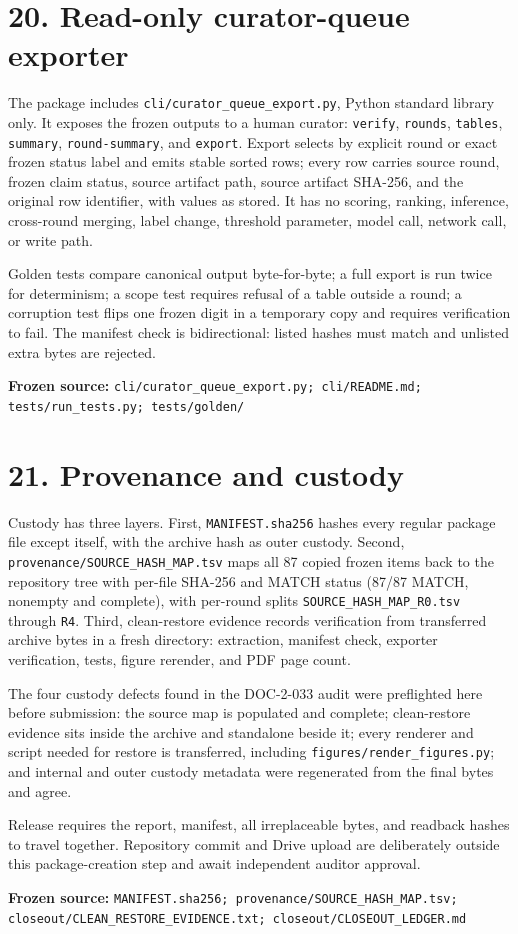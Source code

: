 \documentclass[10pt]{article}
\newcommand{\src}[1]{\par\vfill\noindent\parbox{\linewidth}{\raggedright\sloppy\scriptsize\color{BorderBlue}\textbf{Frozen source:} \texttt{#1}}}
\newcommand{\pg}[2]{\section*{#1}#2}
\begin{document}
\pg{20. Read-only curator-queue exporter}{The package includes \texttt{cli/curator\_queue\_export.py}, Python standard library only. It exposes the frozen outputs to a human curator: \texttt{verify}, \texttt{rounds}, \texttt{tables}, \texttt{summary}, \texttt{round-summary}, and \texttt{export}. Export selects by explicit round or exact frozen status label and emits stable sorted rows; every row carries source round, frozen claim status, source artifact path, source artifact SHA-256, and the original row identifier, with values as stored. It has no scoring, ranking, inference, cross-round merging, label change, threshold parameter, model call, network call, or write path.\par Golden tests compare canonical output byte-for-byte; a full export is run twice for determinism; a scope test requires refusal of a table outside a round; a corruption test flips one frozen digit in a temporary copy and requires verification to fail. The manifest check is bidirectional: listed hashes must match and unlisted extra bytes are rejected.}\src{cli/curator\_queue\_export.py; cli/README.md; tests/run\_tests.py; tests/golden/}\newpage

\pg{21. Provenance and custody}{Custody has three layers. First, \texttt{MANIFEST.sha256} hashes every regular package file except itself, with the archive hash as outer custody. Second, \texttt{provenance/SOURCE\_HASH\_MAP.tsv} maps all 87 copied frozen items back to the repository tree with per-file SHA-256 and MATCH status (87/87 MATCH, nonempty and complete), with per-round splits \texttt{SOURCE\_HASH\_MAP\_R0.tsv} through \texttt{R4}. Third, clean-restore evidence records verification from transferred archive bytes in a fresh directory: extraction, manifest check, exporter verification, tests, figure rerender, and PDF page count.\par The four custody defects found in the DOC-2-033 audit were preflighted here before submission: the source map is populated and complete; clean-restore evidence sits inside the archive and standalone beside it; every renderer and script needed for restore is transferred, including \texttt{figures/render\_figures.py}; and internal and outer custody metadata were regenerated from the final bytes and agree.\par Release requires the report, manifest, all irreplaceable bytes, and readback hashes to travel together. Repository commit and Drive upload are deliberately outside this package-creation step and await independent auditor approval.}\src{MANIFEST.sha256; provenance/SOURCE\_HASH\_MAP.tsv; closeout/CLEAN\_RESTORE\_EVIDENCE.txt; closeout/CLOSEOUT\_LEDGER.md}\newpage
\end{document}
